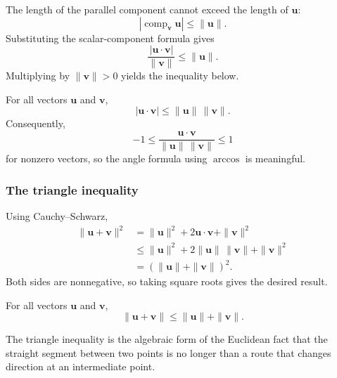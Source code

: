 \begin{proofbox}
The length of the parallel component cannot exceed the length of $\mathbf u$:
\[
\left|\operatorname{comp}_{\mathbf v}\mathbf u\right|
\leq\|\mathbf u\|.
\]
Substituting the scalar-component formula gives
\[
\frac{|\mathbf u\cdot\mathbf v|}{\|\mathbf v\|}
\leq\|\mathbf u\|.
\]
Multiplying by $\|\mathbf v\|>0$ yields the inequality below.
\end{proofbox}

\begin{theorembox}
For all vectors $\mathbf u$ and $\mathbf v$,
\[
\boxed{
|\mathbf u\cdot\mathbf v|
\leq
\|\mathbf u\|\,\|\mathbf v\|
}.
\]
Consequently,
\[
-1\leq
\frac{\mathbf u\cdot\mathbf v}{\|\mathbf u\|\,\|\mathbf v\|}
\leq1
\]
for nonzero vectors, so the angle formula using $\arccos$ is meaningful.
\end{theorembox}

\subsubsection*{The triangle inequality}

\begin{proofbox}
Using Cauchy--Schwarz,
\[
\begin{aligned}
\|\mathbf u+\mathbf v\|^2
&=\|\mathbf u\|^2+2\mathbf u\cdot\mathbf v+\|\mathbf v\|^2\\
&\leq\|\mathbf u\|^2+2\|\mathbf u\|\,\|\mathbf v\|+\|\mathbf v\|^2\\
&=(\|\mathbf u\|+\|\mathbf v\|)^2.
\end{aligned}
\]
Both sides are nonnegative, so taking square roots gives the desired result.
\end{proofbox}

\begin{theorembox}
For all vectors $\mathbf u$ and $\mathbf v$,
\[
\boxed{
\|\mathbf u+\mathbf v\|
\leq
\|\mathbf u\|+\|\mathbf v\|
}.
\]
\end{theorembox}

\begin{interpretationbox}
The triangle inequality is the algebraic form of the Euclidean fact that the
straight segment between two points is no longer than a route that changes
direction at an intermediate point.
\end{interpretationbox}
